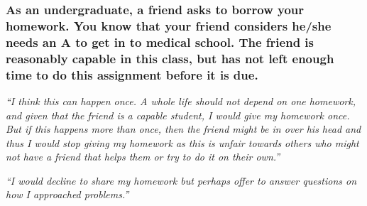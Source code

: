 \documentclass[12pt]{beamer}
\newcommand\ans[1]{{\it ``#1''}}
\newcommand\gap{\vspace{5mm}}
\begin{document}
\begin{frame}

\frametitle{
As an undergraduate, a friend asks to borrow your homework. You know that your friend considers he/she needs an A to get in to medical school. The friend is reasonably capable in this class, but has not left enough time to do this assignment before it is due.
}
\gap









\ans{I think this can happen once.  A whole life should not depend on one homework, and given that the friend is a capable student, I would give my homework once.  But if this happens more than once, then the friend might be in over his head and thus I would stop giving my homework as this is unfair towards others who might not have a friend that helps them or try to do it on their own.}

\ans{I would decline to share my homework but perhaps offer to answer questions on how I approached problems.}

\end{frame}
\end{document}
